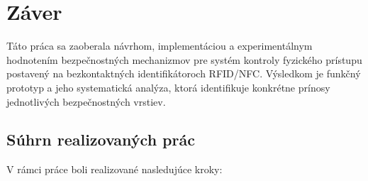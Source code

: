
\section{Záver}
\label{sec:conclusion}

Táto práca sa zaoberala návrhom, implementáciou a experimentálnym hodnotením bezpečnostných mechanizmov pre systém kontroly fyzického prístupu postavený na bezkontaktných identifikátoroch RFID/NFC. Výsledkom je funkčný prototyp a jeho systematická analýza, ktorá identifikuje konkrétne prínosy jednotlivých bezpečnostných vrstiev.

\subsection{Súhrn realizovaných prác}

V rámci práce boli realizované nasledujúce kroky:

